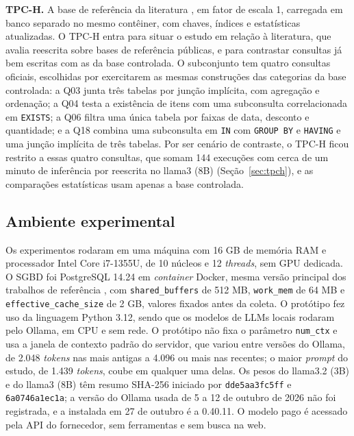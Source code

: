 \documentclass[12pt]{article}
\begin{document}
\textbf{TPC-H.} A base de referência da literatura \cite{tpch}, em fator de escala 1, carregada em banco separado no mesmo contêiner, com chaves, índices e estatísticas atualizadas. O TPC-H entra para situar o estudo em relação à literatura, que avalia reescrita sobre bases de referência públicas, e para contrastar consultas já bem escritas com as da base controlada. O subconjunto tem quatro consultas oficiais, escolhidas por exercitarem as mesmas construções das categorias da base controlada: a Q03 junta três tabelas por junção implícita, com agregação e ordenação; a Q04 testa a existência de itens com uma subconsulta correlacionada em \texttt{EXISTS}; a Q06 filtra uma única tabela por faixas de data, desconto e quantidade; e a Q18 combina uma subconsulta em \texttt{IN} com \texttt{GROUP BY} e \texttt{HAVING} e uma junção implícita de três tabelas. Por ser cenário de contraste, o TPC-H ficou restrito a essas quatro consultas, que somam 144 execuções com cerca de um minuto de inferência por reescrita no llama3 (8B) (Seção~\ref{sec:tpch}), e as comparações estatísticas usam apenas a base controlada.

\subsection{Ambiente experimental}
\label{sec:ambiente}

Os experimentos rodaram em uma máquina com 16 GB de memória RAM e processador Intel Core i7-1355U, de 10 núcleos e 12 \textit{threads}, sem GPU dedicada. O SGBD foi PostgreSQL 14.24 em \textit{container} Docker, mesma versão principal dos trabalhos de referência \cite{sun2025rbot,song2025quite}, com \texttt{shared\_buffers} de 512 MB, \texttt{work\_mem} de 64 MB e \texttt{effective\_cache\_size} de 2 GB, valores fixados antes da coleta. O protótipo fez uso da linguagem Python 3.12, sendo que os modelos de LLMs locais rodaram pelo Ollama, em CPU e sem rede. O protótipo não fixa o parâmetro \texttt{num\_ctx} e usa a janela de contexto padrão do servidor, que variou entre versões do Ollama, de 2.048 \textit{tokens} nas mais antigas a 4.096 ou mais nas recentes; o maior \textit{prompt} do estudo, de 1.439 \textit{tokens}, coube em qualquer uma delas. Os pesos do llama3.2 (3B) e do llama3 (8B) têm resumo SHA-256 iniciado por \texttt{dde5aa3fc5ff} e \texttt{6a0746a1ec1a}; a versão do Ollama usada de 5 a 12 de outubro de 2026 não foi registrada, e a instalada em 27 de outubro é a 0.40.11. O modelo pago é acessado pela API do fornecedor, sem ferramentas e sem busca na web.
\end{document}
